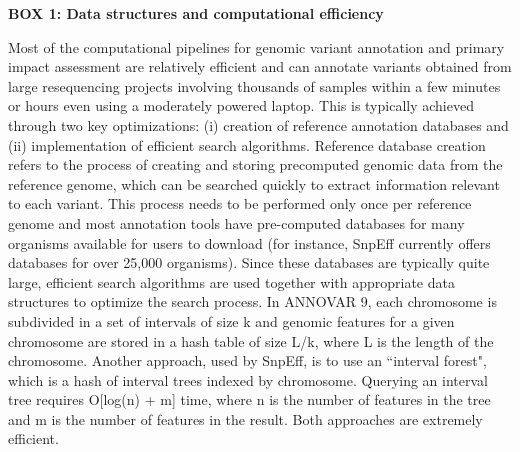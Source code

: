\textbf{BOX 1: Data structures and computational efficiency}
\begin{framed}
Most of the computational pipelines for genomic variant annotation and primary impact assessment are relatively efficient and can annotate variants obtained from large resequencing projects involving thousands of samples within a few minutes or hours even using a moderately powered laptop. This is typically achieved through two key optimizations: (i) creation of reference annotation databases and (ii) implementation of efficient search algorithms. Reference database creation refers to the process of creating and storing precomputed genomic data from the reference genome, which can be searched quickly to extract information relevant to each variant. This process needs to be performed only once per reference genome and most annotation tools have pre-computed databases for many organisms available for users to download (for instance, SnpEff currently offers databases for over 25,000 organisms). Since these databases are typically quite large, efficient search algorithms are used together with appropriate data structures to optimize the search process. In ANNOVAR 9, each chromosome is subdivided in a set of intervals of size k and genomic features for a given chromosome are stored in a hash table of size L/k, where L is the length of the chromosome. Another approach, used by SnpEff, is to use an ``interval forest", which is a hash of interval trees  \cite{REF68} indexed by chromosome. Querying an interval tree requires O[log(n) + m] time, where n is the number of features in the tree and m is the number of features in the result. Both approaches are extremely efficient.
\end{framed}

